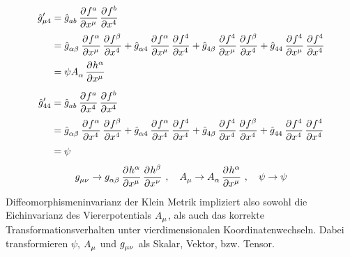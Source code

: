 \begin{equation}
\begin{split}
\tensor*{\hat{g}}{*^\prime_\mu_4}&=\tensor{\hat{g}}{_a_b}\dpd{f^a}{\tensor{x}{^\mu}}\dpd{f^b}{\tensor{x}{^4}}\\
&=\tensor{\hat{g}}{_\alpha_\beta}\dpd{f^\alpha}{\tensor{x}{^\mu}}\dpd{f^\beta}{\tensor{x}{^4}}
+\tensor{\hat{g}}{_\alpha_4}\dpd{f^\alpha}{\tensor{x}{^\mu}}\dpd{f^4}{\tensor{x}{^4}}
+\tensor{\hat{g}}{_4_\beta}\dpd{f^4}{\tensor{x}{^\mu}}\dpd{f^\beta}{\tensor{x}{^4}}
+\tensor{\hat{g}}{_4_4}\dpd{f^4}{\tensor{x}{^\mu}}\dpd{f^4}{\tensor{x}{^4}}\\
&=\psi\tensor{A}{_\alpha}\dpd{h^\alpha}{\tensor{x}{^\mu}}
\end{split}
\end{equation}
\begin{equation}
\begin{split}
\tensor*{\hat{g}}{*^\prime_4_4}&=\tensor{\hat{g}}{_a_b}\dpd{f^a}{\tensor{x}{^4}}\dpd{f^b}{\tensor{x}{^4}}\\
&=\tensor{\hat{g}}{_\alpha_\beta}\dpd{f^\alpha}{\tensor{x}{^4}}\dpd{f^\beta}{\tensor{x}{^4}}
+\tensor{\hat{g}}{_\alpha_4}\dpd{f^\alpha}{\tensor{x}{^4}}\dpd{f^4}{\tensor{x}{^4}}
+\tensor{\hat{g}}{_4_\beta}\dpd{f^4}{\tensor{x}{^4}}\dpd{f^\beta}{\tensor{x}{^4}}
+\tensor{\hat{g}}{_4_4}\dpd{f^4}{\tensor{x}{^4}}\dpd{f^4}{\tensor{x}{^4}}\\
&=\psi
\end{split}
\end{equation}
\begin{equation}
\tensor{g}{_\mu_\nu}\to\tensor{g}{_\alpha_\beta}\dpd{h^\alpha}{\tensor{x}{^\mu}}\dpd{h^\beta}{\tensor{x}{^\nu}}\,,\quad
\tensor{A}{_\mu}\to\tensor{A}{_\alpha}\dpd{h^\alpha}{\tensor{x}{^\mu}}\,,\quad
\psi\to\psi
\end{equation}
Diffeomorphismeninvarianz der Klein Metrik impliziert also sowohl die
Eichinvarianz des Viererpotentials $\tensor{A}{_\mu}$, als auch das korrekte
Transformationsverhalten unter vierdimensionalen Koordinatenwechseln.
Dabei transformieren $\psi$, $\tensor{A}{_\mu}$ und $\tensor{g}{_\mu_\nu}$ als
Skalar, Vektor, bzw. Tensor.
